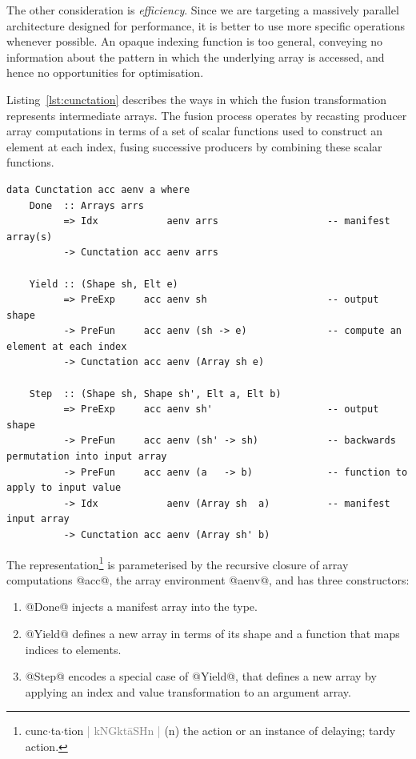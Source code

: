 The other consideration is \emph{efficiency}. Since we are targeting a massively
parallel architecture designed for performance, it is better to use more
specific operations whenever possible. An opaque indexing function is too
general, conveying no information about the pattern in which the underlying
array is accessed, and hence no opportunities for optimisation.

Listing~\ref{lst:cunctation} describes the ways in which the fusion
transformation represents intermediate arrays. The fusion process operates by
recasting producer array computations in terms of a set of scalar functions used
to construct an element at each index, %
fusing successive producers by combining these scalar functions.
%
\begin{lstlisting}[style=haskell_float
    ,label=lst:cunctation
    ,caption={Representation of fusible producer arrays}]
data Cunctation acc aenv a where
    Done  :: Arrays arrs
          => Idx            aenv arrs                   -- manifest array(s)
          -> Cunctation acc aenv arrs

    Yield :: (Shape sh, Elt e)
          => PreExp     acc aenv sh                     -- output shape
          -> PreFun     acc aenv (sh -> e)              -- compute an element at each index
          -> Cunctation acc aenv (Array sh e)

    Step  :: (Shape sh, Shape sh', Elt a, Elt b)
          => PreExp     acc aenv sh'                    -- output shape
          -> PreFun     acc aenv (sh' -> sh)            -- backwards permutation into input array
          -> PreFun     acc aenv (a   -> b)             -- function to apply to input value
          -> Idx            aenv (Array sh  a)          -- manifest input array
          -> Cunctation acc aenv (Array sh' b)
\end{lstlisting}
%
\makeatchar
The representation\footnote{%
cunc$\cdot$ta$\cdot$tion
\textcolor{gray}{|
kNGk\textquotesingle t\={a}SHn \enspace{}\textquotesingle {}
|} (n) the action or an instance of delaying; tardy action.}
\makeatcode
%
is parameterised by the recursive closure of array computations @acc@, the
array environment @aenv@, and has three constructors:
%
\begin{enumerate}
\item @Done@ injects a manifest array into the type.

\item @Yield@ defines a new array in terms of its shape and a function
    that maps indices to elements.

\item @Step@ encodes a special case of @Yield@, that defines a new
    array by applying an index and value transformation to an argument array.

\end{enumerate}

